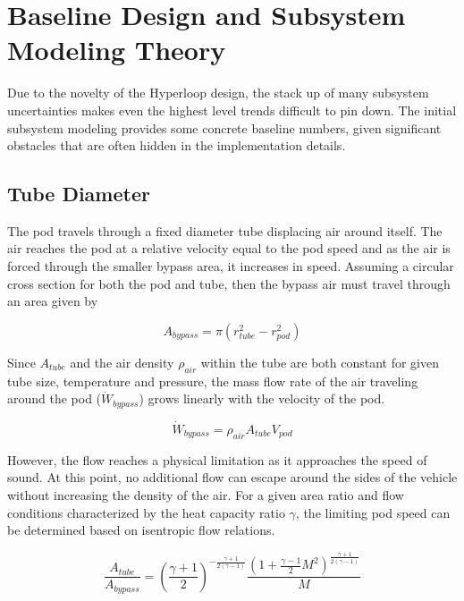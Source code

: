 \documentclass[heading.tex]{subfiles}
\begin{document}
\section{Baseline Design and Subsystem Modeling Theory}


Due to the novelty of the Hyperloop design, the stack up of many subsystem uncertainties makes even the highest level trends difficult to pin down.
The initial subsystem modeling provides some concrete baseline numbers, given significant obstacles that are often hidden in the implementation details. 

\subsection{Tube Diameter}


	The pod travels through a fixed diameter tube displacing air around itself. The air reaches the
pod at a relative velocity equal to the pod speed and as the air is forced through the smaller bypass area, it increases in speed. Assuming a circular cross section for both the pod and tube, then the bypass air must travel through an area given by

\begin{equation*}
A_{bypass} = \pi(r_{tube}^2-r_{pod}^2)
\end{equation*}

Since $A_{tube}$ and the air density $\rho_{air}$ within the tube are both constant for given tube size, temperature and pressure, the mass flow rate of
the air traveling around the pod ($\dot{W}_{bypass}$) grows linearly with the velocity of the pod.

\begin{equation*}
\dot{W}_{bypass} = \rho_{air} A_{tube} V_{pod}
\end{equation*}

However, the flow reaches a physical limitation as it approaches the speed of sound. At this point, no additional flow can escape
around the sides of the vehicle without increasing the density of the air.
For a given area ratio and flow conditions characterized by the heat capacity ratio $\gamma$, the limiting pod speed can be determined based on isentropic flow relations.

\begin{equation*}
\frac{A_{tube}}{A_{bypass}} = \left(\frac{\gamma+1}{2}\right)^{-\frac{\gamma+1}{2\left(\gamma-1\right)}}\frac{\left(1+\frac{\gamma-1}{2}M^{2}\right)^{\frac{\gamma+1}{2\left(\gamma-1\right)}}}{M}
\end{equation*}
\end{document}
